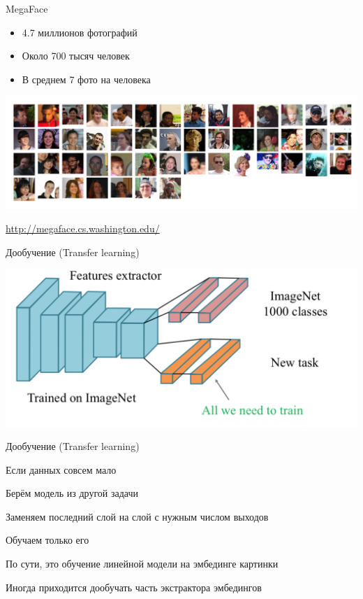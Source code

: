 \documentclass[notes,12pt, aspectratio=169]{beamer}
\newenvironment{wideitemize}{\itemize\addtolength{\itemsep}{10pt}}{\enditemize}
\begin{document}
\begin{frame}{MegaFace}
\begin{itemize}
	\item 4.7 миллионов фотографий
	\item Около 700 тысяч человек
	\item В среднем 7 фото на человека
\end{itemize}
\begin{center}
	\includegraphics[width=.9\linewidth]{megaface.png}
\end{center}
\vfill
\footnotesize
{\color{blue} \url{http://megaface.cs.washington.edu/}} 
\end{frame}


\begin{frame}{Дообучение (Transfer learning)}
\begin{center}
	\includegraphics[width=.8\linewidth]{transfer_learning2.png}
\end{center}
\end{frame}


\begin{frame}{Дообучение (Transfer learning)}
\begin{wideitemize}
	\item Если данных совсем мало
	\item Берём модель из другой задачи
	\item Заменяем последний слой на слой с нужным числом выходов
	\item Обучаем только его
	\item По сути, это обучение линейной модели на эмбединге картинки
	\item Иногда приходится дообучать часть экстрактора эмбедингов
\end{wideitemize}
\end{frame}
\end{document}
